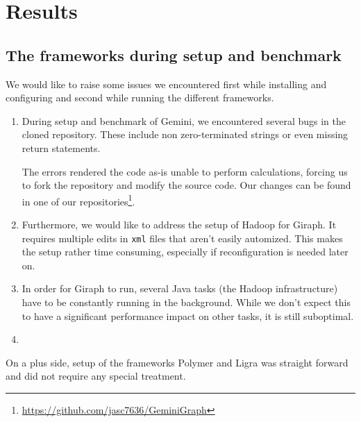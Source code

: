 
\section{Results}



\subsection{The frameworks during setup and benchmark}
We would like to raise some issues we encountered first while installing and configuring and second while running the different frameworks.

\begin{enumerate}
	\item During setup and benchmark of Gemini, we encountered several bugs in the cloned repository. These include non zero-terminated strings or even missing return statements.

	The errors rendered the code as-is unable to perform calculations, forcing us to fork the repository and modify the source code. Our changes can be found in one of our repositories\footnote{\url{https://github.com/jasc7636/GeminiGraph}}.

	\item Furthermore, we would like to address the setup of Hadoop for Giraph. It requires multiple edits in \texttt{xml} files that aren't easily automized. This makes the setup rather time consuming, especially if reconfiguration is needed later on.
	\item In order for Giraph to run, several Java tasks (the Hadoop infrastructure) have to be constantly running in the background. While we don't expect this to have a significant performance impact on other tasks, it is still suboptimal.

	\item 
\end{enumerate}


On a plus side, setup of the frameworks Polymer and Ligra was straight forward and did not require any special treatment. 





